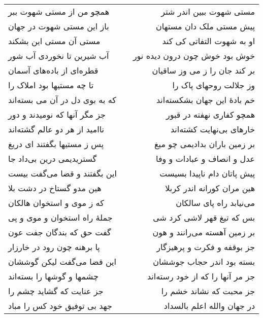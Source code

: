 \begin{center}
\begin{longtable}{l p{0.5cm} r}
همچو من از مستی شهوت ببر
&&
مستی شهوت ببین اندر شتر
\\
باز این مستی شهوت در جهان
&&
پیش مستی ملک دان مستهان
\\
مستی آن مستی این بشکند
&&
او به شهوت التفاتی کی کند
\\
آب شیرین تا نخوردی آب شور
&&
خوش بود خوش چون درون دیده نور
\\
قطره‌ای از باده‌های آسمان
&&
بر کند جان را ز می وز ساقیان
\\
تا چه مستیها بود املاک را
&&
وز جلالت روحهای پاک را
\\
که به بوی دل در آن می بسته‌اند
&&
خم بادهٔ این جهان بشکسته‌اند
\\
جز مگر آنها که نومیدند و دور
&&
همچو کفاری نهفته در قبور
\\
ناامید از هر دو عالم گشته‌اند
&&
خارهای بی‌نهایت کشته‌اند
\\
پس ز مستیها بگفتند ای دریغ
&&
بر زمین باران بدادیمی چو میغ
\\
گستریدیمی درین بی‌داد جا
&&
عدل و انصاف و عبادات و وفا
\\
این بگفتند و قضا می‌گفت بیست
&&
پیش پاتان دام ناپیدا بسیست
\\
هین مدو گستاخ در دشت بلا
&&
هین مران کورانه اندر کربلا
\\
که ز موی و استخوان هالکان
&&
می‌نیابد راه پای سالکان
\\
جملهٔ راه استخوان و موی و پی
&&
بس که تیغ قهر لاشی کرد شی
\\
گفت حق که بندگان جفت عون
&&
بر زمین آهسته می‌رانند و هون
\\
پا برهنه چون رود در خارزار
&&
جز بوقفه و فکرت و پرهیزگار
\\
این قضا می‌گفت لیکن گوششان
&&
بسته بود اندر حجاب جوششان
\\
چشمها و گوشها را بسته‌اند
&&
جز مر آنها را که از خود رسته‌اند
\\
جز عنایت که گشاید چشم را
&&
جز محبت که نشاند خشم را
\\
جهد بی توفیق خود کس را مباد
&&
در جهان والله اعلم بالسداد
\\
\end{longtable}
\end{center}
